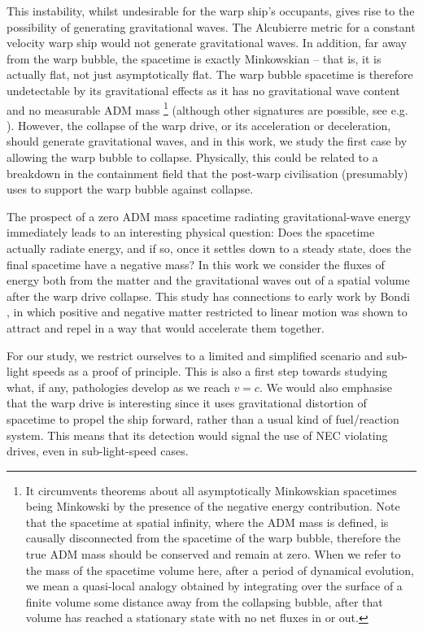 \documentclass[twocolumn, numberedappendix, twocolappendix,apj, iop, a4paper]{openjournal}
\begin{document}
This instability, whilst undesirable for the warp ship's occupants, gives rise to the possibility of generating gravitational waves. The Alcubierre metric for a constant velocity warp ship would not generate gravitational waves. In addition, far away from the warp bubble, the spacetime is exactly Minkowskian -- that is, it is actually flat, not just asymptotically flat. The warp bubble spacetime is therefore undetectable by its gravitational effects as it has no gravitational wave content and no measurable ADM mass \citep{Schuster:2022ati}
\footnote{It circumvents theorems about all asymptotically Minkowskian spacetimes being Minkowski \citep{Witten:1981mf,Schon:1979rg} by the presence of the negative energy contribution. Note that the spacetime at spatial infinity, where the ADM mass is defined, is causally disconnected from the spacetime of the warp bubble, therefore the true ADM mass should be conserved and remain at zero. When we refer to the mass of the spacetime volume here, after a period of dynamical evolution, we mean a quasi-local analogy obtained by integrating over the surface of a finite volume some distance away from the collapsing bubble, after that volume has reached a stationary state with no net fluxes in or out.} (although other signatures are possible, see e.g. \citep{Marzlin:2022hfb}).
However, the collapse of the warp drive, or its acceleration or deceleration, should generate gravitational waves, and in this work, we study the first case by allowing the warp bubble to collapse. Physically, this could be related to a breakdown in the containment field that the post-warp civilisation (presumably) uses to support the warp bubble against collapse.

The prospect of a zero ADM mass spacetime radiating gravitational-wave energy immediately leads to an interesting physical question: Does the spacetime actually radiate energy, and if so, once it settles down to a steady state, does the final spacetime have a negative mass? In this work we consider the fluxes of energy both from the matter and the gravitational waves out of a spatial volume after the warp drive collapse. This study has connections to early work by Bondi \citep{Bondi:1957zz}, in which positive and negative matter restricted to linear motion was shown to attract and repel in a way that would accelerate them together.

For our study, we restrict ourselves to a limited and simplified scenario and sub-light speeds as a proof of principle. This is also a first step towards studying what, if any, pathologies develop as we reach $v=c$. We would also emphasise that the warp drive is interesting since it uses gravitational distortion of spacetime to propel the ship forward, rather than a usual kind of fuel/reaction system. This means that its detection would signal the use of NEC violating drives, even in sub-light-speed cases.
\end{document}
